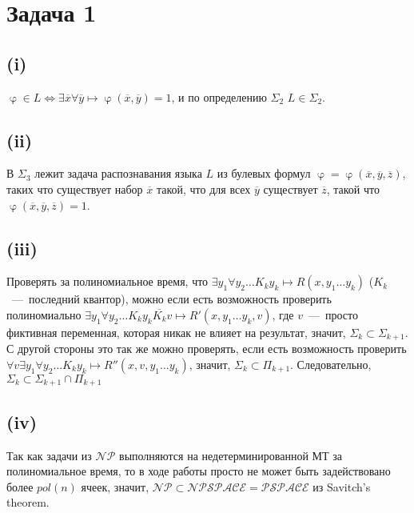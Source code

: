 \documentclass[a4paper,12pt]{article} %
\begin{document}
\section{Задача 1}
\subsection{(i)}
\hspace{5mm}
$\upvarphi\in L\Leftrightarrow\exists\overline{x}\forall\overline{y}\mapsto\upvarphi(\overline{x},\overline{y})=1$, и по определению $\Sigma_2$ $L\in\Sigma_2$.

\subsection{(ii)}
\hspace{5mm}
В $\Sigma_3$ лежит задача распознавания языка $L$ из булевых формул $\upvarphi=\upvarphi(\overline{x},\overline{y},\overline{z})$, таких что существует набор $\overline{x}$ такой, что для всех $\overline{y}$ существует $\overline{z}$, такой что $\upvarphi(\overline{x},\overline{y},\overline{z})=1$.

\subsection{(iii)}
\hspace{5mm}
Проверять за полиномиальное время, что $\exists y_1\forall y_2\ldots K_{k} y_{k}\mapsto R(x,y_1\ldots y_k)$ ($K_k$~---~последний квантор), можно если есть возможность проверить полиномиально $\exists y_1\forall y_2\ldots K_{k} y_{k} \overline{K_{k}} v\mapsto R'(x,y_1\ldots y_k,v)$, где $v$~---~просто фиктивная переменная, которая никак не влияет на результат, значит, $\Sigma_k\subset \Sigma_{k+1}$. С другой стороны это так же можно проверять, если есть возможность проверить $\forall v\exists y_1\forall y_2\ldots K_{k} y_{k}\mapsto R''(x,v,y_1\ldots y_k)$, значит, $\Sigma_k\subset \Pi_{k+1}$. Следовательно, $\Sigma_k\subset \Sigma_{k+1}\cap\Pi_{k+1}$

\subsection{(iv)}
\hspace{5mm}
Так как задачи из $\mathcal{NP}$ выполняются на недетерминированной МТ за полиномиальное время, то в ходе работы просто не может быть задействовано более $pol(n)$ ячеек, значит, $\mathcal{NP}\subset \mathcal{NPSPACE}=\mathcal{PSPACE}$ из Savitch's theorem. 
\end{document}
